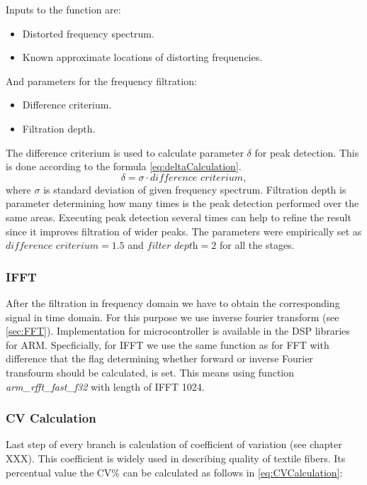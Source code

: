 \documentclass[twoside]{ctuthesis}
\theoremstyle{plain}
\theoremstyle{definition}
\theoremstyle{note}
\begin{document}
Inputs to the function are:
\begin{itemize}
	\setlength{\itemsep}{5pt}
	\item Distorted frequency spectrum.
	\item Known approximate locations of distorting frequencies.
\end{itemize}
And parameters for the frequency filtration:
\begin{itemize}
	\setlength{\itemsep}{5pt}
	\item Difference criterium.
	\item Filtration depth.
\end{itemize}
The difference criterium is used to calculate parameter $\delta$ for peak detection. This is done according to the formula \ref{eq:deltaCalculation}.
\begin{equation} \label{eq:deltaCalculation}
\delta = \sigma \cdot \textit{difference criterium},
\end{equation}
where $\sigma$ is standard deviation of given frequency spectrum.
Filtration depth is parameter determining how many times is the peak detection performed over the same areas. Executing peak detection several times can help to refine the result since it improves filtration of wider peaks. The parameters were empirically set as $\textit{difference criterium}=1.5$ and $\textit{filter depth} = 2$ for all the stages.

\subsubsection{IFFT}
After the filtration in frequency domain we have to obtain the corresponding signal in time domain. For this purpose we use inverse fourier transform (see \ref{sec:FFT}). Implementation for microcontroller is available in the DSP libraries for ARM. Specficially, for IFFT we use the same function as for FFT with difference that the flag determining whether forward or inverse Fourier transfourm should be calculated, is set. This means using function \textit{arm\_rfft\_fast\_f32} with length of IFFT 1024.

\subsubsection{CV Calculation}
Last step of every branch is calculation of coefficient of variation (see chapter XXX). This coefficient is widely used in describing quality of textile fibers. Its percentual value the CV\% can be calculated as follows in \ref{eq:CVCalculation}:
\end{document}
